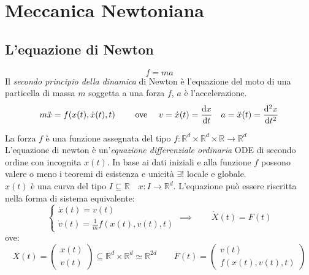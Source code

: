 \section{Meccanica Newtoniana}


\subsection{L'equazione di Newton}
\begin{equation}
    f = m a 
\end{equation}
Il \textit{secondo principio della dinamica} di Newton è l'equazione del moto di una particella di massa $m$ 
soggetta a una forza $f$, $a$ è l'accelerazione.\\ 
\begin{equation}
    m \ddot{x} = f( x(t),\dot{x}(t), t) \qquad \text{ ove } \quad v = \dot{x}(t) = \dv{x}{t}\quad a = \ddot{x}(t)= \dv[2]{x}{t}
\end{equation}

La forza $f$ è una funzione assegnata del tipo $f: \mathbb{R}^d\times \mathbb{R}^d \times \mathbb{R} \rightarrow \mathbb{R}^d$\\
L'equazione di newton è un'\textit{equazione differenziale ordinaria} ODE di secondo ordine con incognita $x(t)$. 
In base ai dati iniziali e alla funzione $f$ possono valere o meno i teoremi di esistenza e unicità $\exists!$ locale e globale.\\ 
$x(t)$ è una curva del tipo $I \subseteq \mathbb{R}\quad x: I \rightarrow \mathbb{R}^d $. L'equazione può essere 
riscritta nella forma di sistema equivalente:
\begin{equation}
    \begin{cases}
        \dot{x}(t) = v(t)\\ 
        \dot{v}(t) =\frac{1}{m} f( x(t), v(t), t)
    \end{cases}
    \implies
    \qquad
    \dot{X}(t)= F(t)
\end{equation}
ove:
\begin{equation*}
    X (t) = \begin{pmatrix}
        x (t) \\ 
        v (t)
    \end{pmatrix} \subseteq \mathbb{R}^d \times \mathbb{R}^d \simeq \mathbb{R}^{2d} \qquad
    F (t) = \begin{pmatrix}
        v(t) \\
        f(x(t), v(t),t)
    \end{pmatrix}
\end{equation*}

